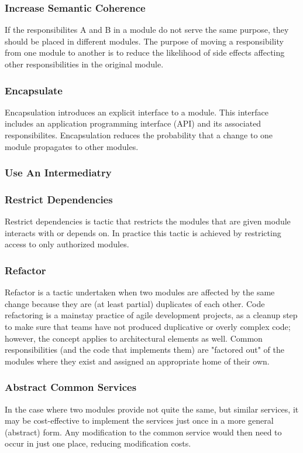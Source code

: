 \documentclass{report}
\begin{document}
\subsubsection{Increase Semantic Coherence}
If the responsibilites A and B in a module do not serve the same purpose, they should be placed in different modules. The purpose of moving a responsibility from one module to another is to reduce the likelihood of side effects affecting other responsibilities in the original module.

\subsubsection{Encapsulate}
Encapsulation introduces an explicit interface to a module. This interface includes an application programming interface (API) and its associated responsibilites. Encapsulation reduces the probability that a change to one module propagates to other modules.

\subsubsection{Use An Intermediatry}


\subsubsection{Restrict Dependencies}
Restrict dependencies is tactic that restricts the modules that are given module interacts with or depends on. In practice this tactic is achieved by restricting access to only authorized modules.


\subsubsection{Refactor}
Refactor is a tactic undertaken when two modules are affected by the same change because they are (at least partial) duplicates of each other. Code refactoring is a mainstay practice of agile development projects, as a cleanup step to make sure that teams have not produced duplicative or overly complex code; however, the concept applies to architectural elements as well. Common responsibilities (and the code that implements them) are "factored out" of the modules where they exist and assigned an appropriate home of their own.

\subsubsection{Abstract Common Services}
In the case where two modules provide not quite the same, but similar services, it may be cost-effective to implement the services just once in a more general (abstract) form. Any modification to the common service would then need to occur in just one place, reducing modification costs.
\end{document}
